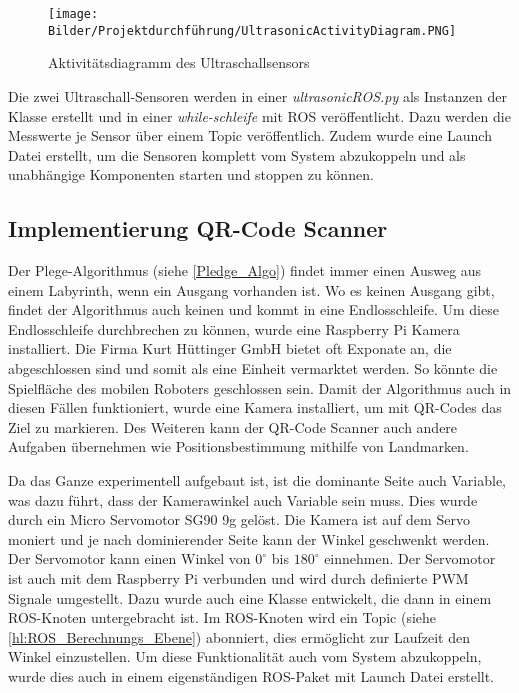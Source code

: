 \begin{figure}[H]
 \centering
 \texttt{[image: Bilder/Projektdurchführung/UltrasonicActivityDiagram.PNG]}
 \caption{Aktivitätsdiagramm des Ultraschallsensors}
 \label{fig:activityUltrasonic}
\end{figure}

Die zwei Ultraschall-Sensoren werden in einer \textit{ultrasonicROS.py} als Instanzen der Klasse erstellt und in einer \textit{while-schleife} mit ROS veröffentlicht. Dazu werden die Messwerte je Sensor über einem Topic veröffentlich. Zudem wurde eine Launch Datei erstellt, um die Sensoren komplett vom System abzukoppeln und als unabhängige Komponenten starten und stoppen zu können.  

\subsection{Implementierung QR-Code Scanner} 

Der Plege-Algorithmus (siehe \autoref{Pledge_Algo}) findet immer einen Ausweg aus einem Labyrinth, wenn ein Ausgang vorhanden ist. Wo es keinen Ausgang gibt, findet der Algorithmus auch keinen und kommt in eine Endlosschleife. Um diese Endlosschleife durchbrechen zu können, wurde eine Raspberry Pi Kamera installiert. Die Firma Kurt Hüttinger GmbH bietet oft Exponate an, die abgeschlossen sind und somit als eine Einheit vermarktet werden. So könnte die Spielfläche des mobilen Roboters geschlossen sein. Damit der Algorithmus auch in diesen Fällen funktioniert, wurde eine Kamera installiert, um mit QR-Codes das Ziel zu markieren. Des Weiteren kann der QR-Code Scanner auch andere Aufgaben übernehmen wie Positionsbestimmung mithilfe von Landmarken.  

Da das Ganze experimentell aufgebaut ist, ist die dominante Seite auch Variable, was dazu führt, dass der Kamerawinkel auch Variable sein muss. Dies wurde durch ein Micro Servomotor SG90 9g gelöst. Die Kamera ist auf dem Servo moniert und je nach dominierender Seite kann der Winkel geschwenkt werden. Der Servomotor kann einen Winkel von $0^\circ$ bis $180^\circ$ einnehmen. Der Servomotor ist auch mit dem Raspberry Pi verbunden und wird durch definierte PWM Signale umgestellt. Dazu wurde auch eine Klasse entwickelt, die dann in einem ROS-Knoten untergebracht ist. Im ROS-Knoten wird ein Topic (siehe \autoref{hl:ROS_Berechnungs_Ebene}) abonniert, dies ermöglicht zur Laufzeit den Winkel einzustellen. Um diese Funktionalität auch vom System abzukoppeln, wurde dies auch in einem eigenständigen ROS-Paket mit Launch Datei erstellt.  

